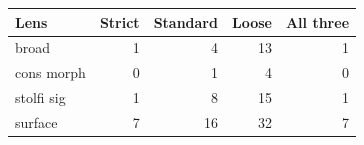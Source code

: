 {\small
\begin{tabular}{lrrrr}
\toprule
Lens & Strict & Standard & Loose & All three \\
\midrule
broad & 1 & 4 & 13 & 1 \\
cons morph & 0 & 1 & 4 & 0 \\
stolfi sig & 1 & 8 & 15 & 1 \\
surface & 7 & 16 & 32 & 7 \\
\bottomrule
\end{tabular}
}
